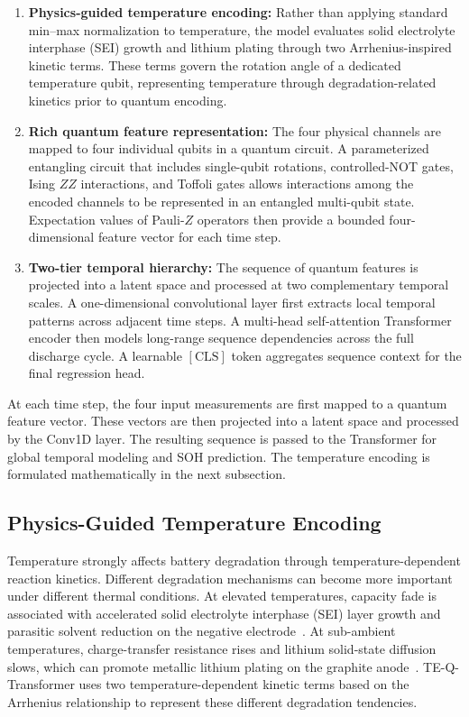 \documentclass[a4paper,fleqn]{cas-sc}
\begin{document}
\begin{enumerate}[leftmargin=*,noitemsep,topsep=3pt]
\item \textbf{Physics-guided temperature encoding:} Rather than applying standard min--max normalization to temperature, the model evaluates solid electrolyte interphase (SEI) growth and lithium plating through two Arrhenius-inspired kinetic terms. These terms govern the rotation angle of a dedicated temperature qubit, representing temperature through degradation-related kinetics prior to quantum encoding.
\item \textbf{Rich quantum feature representation:} The four physical channels are mapped to four individual qubits in a quantum circuit. A parameterized entangling circuit that includes single-qubit rotations, controlled-NOT gates, Ising $ZZ$ interactions, and Toffoli gates allows interactions among the encoded channels to be represented in an entangled multi-qubit state. Expectation values of Pauli-$Z$ operators then provide a bounded four-dimensional feature vector for each time step.
\item \textbf{Two-tier temporal hierarchy:} The sequence of quantum features is projected into a latent space and processed at two complementary temporal scales. A one-dimensional convolutional layer first extracts local temporal patterns across adjacent time steps. A multi-head self-attention Transformer encoder then models long-range sequence dependencies across the full discharge cycle. A learnable $\mathrm{[CLS]}$ token aggregates sequence context for the final regression head.
\end{enumerate}

At each time step, the four input measurements are first mapped to a quantum feature vector. These vectors are then projected into a latent space and processed by the Conv1D layer. The resulting sequence is passed to the Transformer for global temporal modeling and SOH prediction. The temperature encoding is formulated mathematically in the next subsection.

\subsection{Physics-Guided Temperature Encoding}\label{sec:temp_encoding}

Temperature strongly affects battery degradation through temperature-dependent reaction kinetics. Different degradation mechanisms can become more important under different thermal conditions. At elevated temperatures, capacity fade is associated with accelerated solid electrolyte interphase (SEI) layer growth and parasitic solvent reduction on the negative electrode~\citep{waldmann2014temperature}. At sub-ambient temperatures, charge-transfer resistance rises and lithium solid-state diffusion slows, which can promote metallic lithium plating on the graphite anode~\citep{yang2018understanding}. TE-Q-Transformer uses two temperature-dependent kinetic terms based on the Arrhenius relationship to represent these different degradation tendencies.
\end{document}
